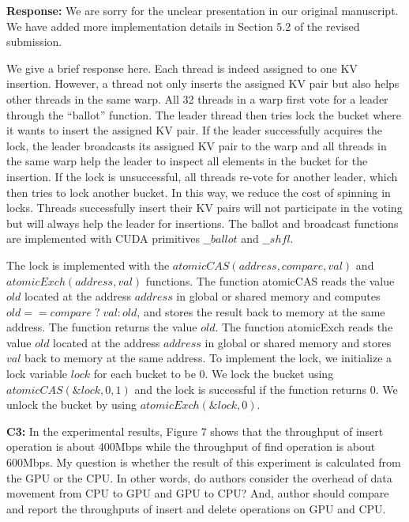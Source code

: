 \noindent\textbf{Response:} We are sorry for the unclear presentation in our original manuscript. We have added more implementation details in Section 5.2 of the revised submission. 

We give a brief response here. Each thread is indeed assigned to one KV insertion. 
However, a thread not only inserts the assigned KV pair but also helps other threads in the same warp.
All 32 threads in a warp first vote for a leader through the ``ballot'' function.
The leader thread then tries lock the bucket where it wants to insert the assigned KV pair. 
If the leader successfully acquires the lock, the leader broadcasts its assigned KV pair to the warp and all threads in the same warp help the leader to inspect all elements in the bucket for the insertion. If the lock is unsuccessful, all threads re-vote for another leader, which then tries to lock another bucket. In this way, we reduce the cost of spinning in locks. Threads successfully insert their KV pairs will not participate in the voting but will always help the leader for insertions. 
The ballot and broadcast functions are implemented with CUDA primitives $\_\_ballot$ and $\_\_shfl$.

The lock is implemented with the $atomicCAS(address,compare,val)$ and $atomicExch(address,val)$ functions. 
The function atomicCAS reads the value $old$ located at the address $address$ in global or shared memory and computes $old == compare \;?\; val : old$, and stores the result back to memory at the same address.
The function returns the value $old$. 
The function atomicExch reads the value $old$ located at the address $address$ in global or shared memory and stores $val$ back to memory at the same address.
To implement the lock, we initialize a lock variable $lock$ for each bucket to be $0$. 
We lock the bucket using $atomicCAS(\&lock,0,1)$ and the lock is successful if the function returns $0$. 
We unlock the bucket by using $atomicExch(\&lock,0)$. 



 

\begin{shaded}
	\noindent\textbf{C3:} In the experimental results, Figure 7 shows that the throughput of insert operation is about 400Mbps while the throughput of find operation is about 600Mbps. My question is whether the result of this experiment is calculated from the GPU or the CPU. In other words, do authors consider the overhead of data movement from CPU to GPU and GPU to CPU? And, author should compare and report the throughputs of insert and delete operations on GPU and CPU.
\end{shaded}

